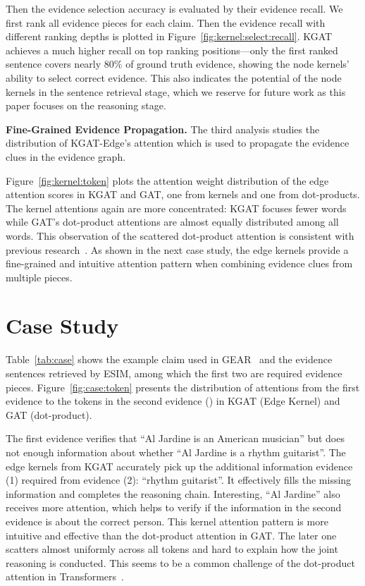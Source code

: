 \documentclass[11pt,a4paper]{article}
\begin{document}
Then the evidence selection accuracy is evaluated by their evidence recall. We first rank all evidence pieces for each claim. Then the evidence recall with different ranking depths is plotted in Figure~\ref{fig:kernel:select:recall}. KGAT achieves a much higher recall on top ranking positions---only the first ranked sentence covers nearly 80\% of ground truth evidence, showing the node kernels' ability to select correct evidence. This also indicates the potential of the node kernels in the sentence retrieval stage, which we reserve for future work as this paper focuses on the reasoning stage.

\textbf{Fine-Grained Evidence Propagation.} 
The third analysis studies the distribution of KGAT-Edge's attention which is used to propagate the evidence clues in the evidence graph.

Figure~\ref{fig:kernel:token} plots the attention weight distribution of the edge attention scores in KGAT and GAT, one from kernels and one from dot-products.
The kernel attentions again are more concentrated: KGAT focuses fewer words while GAT's dot-product attentions are almost equally distributed among all words. This observation of the scattered dot-product attention is consistent with previous research~\cite{clark2019does}.
As shown in the next case study, the edge kernels provide a fine-grained and intuitive attention pattern when combining evidence clues from multiple pieces.


\section{Case Study}
Table~\ref{tab:case} shows the example claim used in GEAR~\cite{zhou2019gear} and the evidence sentences retrieved by ESIM, among which the first two are required evidence pieces.
Figure~\ref{fig:case:token} presents the distribution of attentions from the first evidence to the tokens in the second evidence () in KGAT (Edge Kernel) and GAT (dot-product). 




The first evidence verifies that ``Al Jardine is an American musician'' but does not enough information about whether ``Al Jardine is a rhythm guitarist''. The edge kernels from KGAT accurately pick up the additional information evidence (1) required from evidence (2): ``rhythm guitarist''. It effectively fills the missing information and completes the reasoning chain. Interesting, ``Al Jardine'' also receives more attention, which helps to verify if the information in the second evidence is about the correct person. This kernel attention pattern is more intuitive and effective than the dot-product attention in GAT. The later one scatters almost uniformly across all tokens and hard to explain how the joint reasoning is conducted. This seems to be a common challenge of the dot-product attention in Transformers~\cite{clark2019does}.
\end{document}
